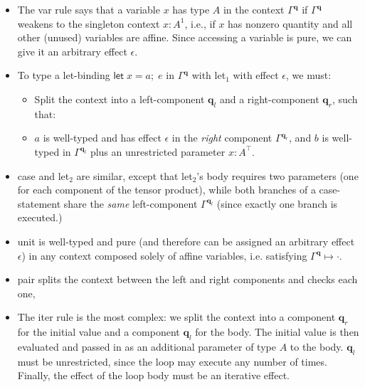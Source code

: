 \documentclass[acmsmall,screen,review]{acmart}
\newcommand{\mb}[1]{\ensuremath{\mathbf{#1}}}
\newcommand{\ms}[1]{\ensuremath{\mathsf{#1}}}
\newcommand{\letexpr}[3]{\ensuremath{\ms{let}\;#1 = #2;\;#3}}
\newcommand{\cwk}[2]{#1 \mapsto #2}
\newcommand{\brle}[1]{{\textsf{#1}}}
\newcommand{\oneq}{1}
\begin{document}
\begin{itemize}
  \item The \brle{var} rule says that a variable $x$ has type $A$ in
  the context $\Gamma^{\mb{q}}$ if $\Gamma^{\mb{q}}$ weakens to the singleton context $x: A^\oneq$,
  i.e., if $x$ has nonzero quantity and all other (unused) variables are affine. Since accessing a
  variable is pure, we can give it an arbitrary effect
  $\epsilon$. 
  \item To type a let-binding $\letexpr{x}{a}{e}$ in $\Gamma^{\mb{q}}$ with \brle{let$_1$} with
  effect $\epsilon$, we must:
  \begin{itemize}
    \item Split the context into a left-component $\mb{q}_l$ and a right-component
    $\mb{q}_r$, such that:
    \item $a$ is well-typed and has effect $\epsilon$ in the \emph{right} component
    $\Gamma^{\mb{q}_r}$, and $b$ is well-typed in $\Gamma^{\mb{q}_l}$ plus an unrestricted parameter $x: A^\top$.
  \end{itemize}
  \item \brle{case} and \brle{let$_2$} are similar, except that \brle{let$_2$}'s body requires two
  parameters (one for each component of the tensor product), while both branches of a case-statement
  share the \emph{same} left-component $\Gamma^{\mb{q}_l}$ (since exactly one branch is executed.)
  \item \brle{unit} is well-typed and pure (and therefore can be assigned an arbitrary effect
  $\epsilon$) in any context composed solely of affine variables, i.e. satisfying
  $\cwk{\Gamma^{\mb{q}}}{\cdot}$.
  \item \brle{pair} splits the context between
  the left and right components and checks each one,
  \item The \brle{iter} rule is the most complex: we split the context into a
  component $\mb{q}_r$ for the initial value and a component $\mb{q}_l$ for the body. The initial
  value is then evaluated and passed in as an additional parameter of type $A$ to the body. 
  $\mb{q}_l$ must be unrestricted, since the loop may execute any number of
  times. Finally, the effect of the loop body must be an iterative effect.
\end{itemize}
\end{document}
